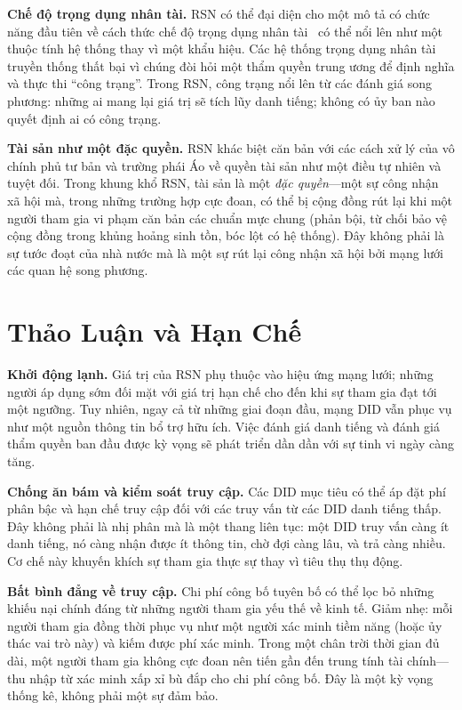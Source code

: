 \documentclass[11pt,a4paper,twocolumn]{article}
\begin{document}
\textbf{Chế độ trọng dụng nhân tài.} RSN có thể đại diện cho một mô tả có chức năng đầu tiên về cách thức chế độ trọng dụng nhân tài~\cite{young1958} có thể nổi lên như một thuộc tính hệ thống thay vì một khẩu hiệu. Các hệ thống trọng dụng nhân tài truyền thống thất bại vì chúng đòi hỏi một thẩm quyền trung ương để định nghĩa và thực thi ``công trạng''. Trong RSN, công trạng nổi lên từ các đánh giá song phương: những ai mang lại giá trị sẽ tích lũy danh tiếng; không có ủy ban nào quyết định ai có công trạng.

\textbf{Tài sản như một đặc quyền.} RSN khác biệt căn bản với các cách xử lý của vô chính phủ tư bản và trường phái Áo về quyền tài sản như một điều tự nhiên và tuyệt đối. Trong khung khổ RSN, tài sản là một \emph{đặc quyền}---một sự công nhận xã hội mà, trong những trường hợp cực đoan, có thể bị cộng đồng rút lại khi một người tham gia vi phạm căn bản các chuẩn mực chung (phản bội, từ chối bảo vệ cộng đồng trong khủng hoảng sinh tồn, bóc lột có hệ thống). Đây không phải là sự tước đoạt của nhà nước mà là một sự rút lại công nhận xã hội bởi mạng lưới các quan hệ song phương.

\section{Thảo Luận và Hạn Chế}

\textbf{Khởi động lạnh.} Giá trị của RSN phụ thuộc vào hiệu ứng mạng lưới; những người áp dụng sớm đối mặt với giá trị hạn chế cho đến khi sự tham gia đạt tới một ngưỡng. Tuy nhiên, ngay cả từ những giai đoạn đầu, mạng DID vẫn phục vụ như một nguồn thông tin bổ trợ hữu ích. Việc đánh giá danh tiếng và đánh giá thẩm quyền ban đầu được kỳ vọng sẽ phát triển dần dần với sự tinh vi ngày càng tăng.

\textbf{Chống ăn bám và kiểm soát truy cập.} Các DID mục tiêu có thể áp đặt phí phân bậc và hạn chế truy cập đối với các truy vấn từ các DID danh tiếng thấp. Đây không phải là nhị phân mà là một thang liên tục: một DID truy vấn càng ít danh tiếng, nó càng nhận được ít thông tin, chờ đợi càng lâu, và trả càng nhiều. Cơ chế này khuyến khích sự tham gia thực sự thay vì tiêu thụ thụ động.

\textbf{Bất bình đẳng về truy cập.} Chi phí công bố tuyên bố có thể lọc bỏ những khiếu nại chính đáng từ những người tham gia yếu thế về kinh tế. Giảm nhẹ: mỗi người tham gia đồng thời phục vụ như một người xác minh tiềm năng (hoặc ủy thác vai trò này) và kiếm được phí xác minh. Trong một chân trời thời gian đủ dài, một người tham gia không cực đoan nên tiến gần đến trung tính tài chính---thu nhập từ xác minh xấp xỉ bù đắp cho chi phí công bố. Đây là một kỳ vọng thống kê, không phải một sự đảm bảo.
\end{document}
